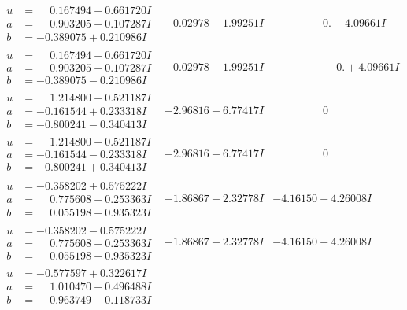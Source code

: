 \documentclass[1p]{elsarticle_modified}
\theoremstyle{definition}
\begin{document}
$$\begin{array}{c|c|c}
\begin{aligned}
u &= \phantom{-}0.167494 + 0.661720 I \\
a &= \phantom{-}0.903205 + 0.107287 I \\
b &= -0.389075 + 0.210986 I\end{aligned}
 & -0.02978 + 1.99251 I & \phantom{-0.000000 } 0. - 4.09661 I \\ \hline\begin{aligned}
u &= \phantom{-}0.167494 - 0.661720 I \\
a &= \phantom{-}0.903205 - 0.107287 I \\
b &= -0.389075 - 0.210986 I\end{aligned}
 & -0.02978 - 1.99251 I & \phantom{-0.000000 -}0. + 4.09661 I \\ \hline\begin{aligned}
u &= \phantom{-}1.214800 + 0.521187 I \\
a &= -0.161544 + 0.233318 I \\
b &= -0.800241 - 0.340413 I\end{aligned}
 & -2.96816 - 6.77417 I & \phantom{-0.000000 } 0 \\ \hline\begin{aligned}
u &= \phantom{-}1.214800 - 0.521187 I \\
a &= -0.161544 - 0.233318 I \\
b &= -0.800241 + 0.340413 I\end{aligned}
 & -2.96816 + 6.77417 I & \phantom{-0.000000 } 0 \\ \hline\begin{aligned}
u &= -0.358202 + 0.575222 I \\
a &= \phantom{-}0.775608 + 0.253363 I \\
b &= \phantom{-}0.055198 + 0.935323 I\end{aligned}
 & -1.86867 + 2.32778 I & -4.16150 - 4.26008 I \\ \hline\begin{aligned}
u &= -0.358202 - 0.575222 I \\
a &= \phantom{-}0.775608 - 0.253363 I \\
b &= \phantom{-}0.055198 - 0.935323 I\end{aligned}
 & -1.86867 - 2.32778 I & -4.16150 + 4.26008 I \\ \hline\begin{aligned}
u &= -0.577597 + 0.322617 I \\
a &= \phantom{-}1.010470 + 0.496488 I \\
b &= \phantom{-}0.963749 - 0.118733 I\end{aligned}

\end{array}$$
\end{document}
